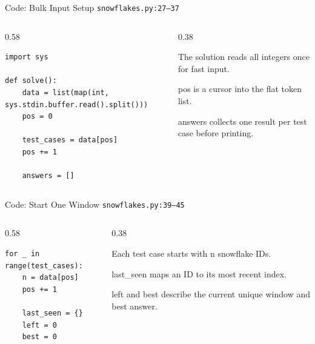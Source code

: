 \documentclass[aspectratio=169,11pt]{beamer}
\begin{document}
\begin{frame}[fragile]{Code: Bulk Input Setup}
\scriptsize
{} \texttt{snowflakes.py:27--37}

\vspace{0.08cm}
\begin{columns}[T,totalwidth=\textwidth]
\begin{column}{0.58\textwidth}
\begin{lstlisting}[style=cpcode]
import sys

def solve():
    data = list(map(int, sys.stdin.buffer.read().split()))
    pos = 0

    test_cases = data[pos]
    pos += 1

    answers = []
\end{lstlisting}
\end{column}
\begin{column}{0.38\textwidth}
\begin{tightitemize}
  \item The solution reads all integers once for fast input.
  \item pos is a cursor into the flat token list.
  \item answers collects one result per test case before printing.
\end{tightitemize}
\end{column}
\end{columns}
\end{frame}

\begin{frame}[fragile]{Code: Start One Window}
\scriptsize
{} \texttt{snowflakes.py:39--45}

\vspace{0.08cm}
\begin{columns}[T,totalwidth=\textwidth]
\begin{column}{0.58\textwidth}
\begin{lstlisting}[style=cpcode]
for _ in range(test_cases):
    n = data[pos]
    pos += 1

    last_seen = {}
    left = 0
    best = 0
\end{lstlisting}
\end{column}
\begin{column}{0.38\textwidth}
\begin{tightitemize}
  \item Each test case starts with n snowflake IDs.
  \item last\_seen maps an ID to its most recent index.
  \item left and best describe the current unique window and best answer.
\end{tightitemize}
\end{column}
\end{columns}
\end{frame}
\end{document}
